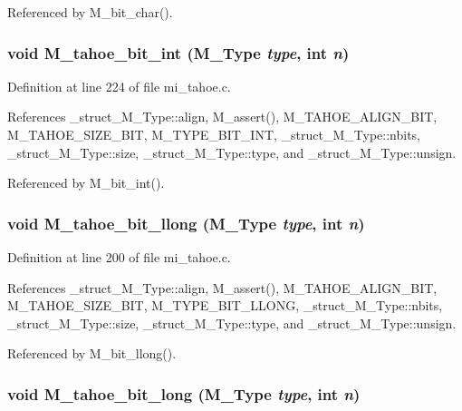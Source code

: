 Referenced by M\_\-bit\_\-char().
\subsubsection{\setlength{\rightskip}{0pt plus 5cm}void M\_\-tahoe\_\-bit\_\-int (\bf{M\_\-Type} {\em type}, int {\em n})}\label{mi__tahoe_8c_0628ab5edcaae873895eb3622bab42ac}




Definition at line 224 of file mi\_\-tahoe.c.

References \_\-struct\_\-M\_\-Type::align, M\_\-assert(), M\_\-TAHOE\_\-ALIGN\_\-BIT, M\_\-TAHOE\_\-SIZE\_\-BIT, M\_\-TYPE\_\-BIT\_\-INT, \_\-struct\_\-M\_\-Type::nbits, \_\-struct\_\-M\_\-Type::size, \_\-struct\_\-M\_\-Type::type, and \_\-struct\_\-M\_\-Type::unsign.

Referenced by M\_\-bit\_\-int().
\subsubsection{\setlength{\rightskip}{0pt plus 5cm}void M\_\-tahoe\_\-bit\_\-llong (\bf{M\_\-Type} {\em type}, int {\em n})}\label{mi__tahoe_8c_eea59b82c8e601d5428ad72549791743}




Definition at line 200 of file mi\_\-tahoe.c.

References \_\-struct\_\-M\_\-Type::align, M\_\-assert(), M\_\-TAHOE\_\-ALIGN\_\-BIT, M\_\-TAHOE\_\-SIZE\_\-BIT, M\_\-TYPE\_\-BIT\_\-LLONG, \_\-struct\_\-M\_\-Type::nbits, \_\-struct\_\-M\_\-Type::size, \_\-struct\_\-M\_\-Type::type, and \_\-struct\_\-M\_\-Type::unsign.

Referenced by M\_\-bit\_\-llong().
\subsubsection{\setlength{\rightskip}{0pt plus 5cm}void M\_\-tahoe\_\-bit\_\-long (\bf{M\_\-Type} {\em type}, int {\em n})}\label{mi__tahoe_8c_69b7fbdb4a30e5f0e03d027edf26d711}




